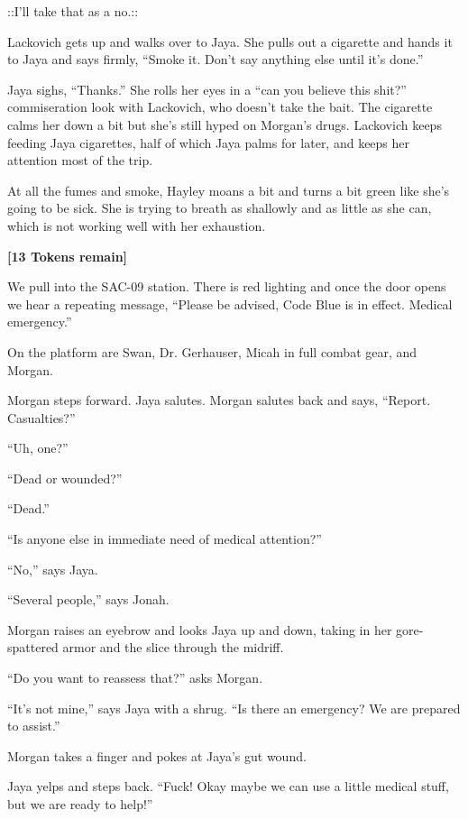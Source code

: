  {\color[RGB]{74,134,232}::I'll take that as a no.::} 



Lackovich gets up and walks over to Jaya.  She pulls out a cigarette and hands it to Jaya and says firmly, ``Smoke it.  Don't say anything else until it's done.''

Jaya sighs, ``Thanks.'' She rolls her eyes in a ``can you believe this shit?'' commiseration look with Lackovich, who doesn't take the bait.  The cigarette calms her down a bit but she's still hyped on Morgan's drugs.  Lackovich keeps feeding Jaya cigarettes, half of which Jaya palms for later, and keeps her attention most of the trip.

At all the fumes and smoke, Hayley moans a bit and turns a bit green like she's going to be sick. She is trying to breath as shallowly and as little as she can, which is not working well with her exhaustion.



\textbf{{[}13 Tokens remain{]}}





We pull into the SAC-09 station.  There is red lighting and once the door opens we hear a repeating message, ``Please be advised, Code Blue is in effect.  Medical emergency.''

On the platform are Swan, Dr. Gerhauser, Micah in full combat gear, and Morgan.



Morgan steps forward.  Jaya salutes.  Morgan salutes back and says, ``Report.  Casualties?''

``Uh, one?''

``Dead or wounded?''

``Dead.''

``Is anyone else in immediate need of medical attention?''

``No,'' says Jaya.

``Several people,'' says Jonah.

Morgan raises an eyebrow and looks Jaya up and down, taking in her gore-spattered armor and the slice through the midriff.

``Do you want to reassess that?'' asks Morgan.

``It's not mine,'' says Jaya with a shrug.  ``Is there an emergency?  We are prepared to assist.''

Morgan takes a finger and pokes at Jaya's gut wound.

Jaya yelps and steps back. ``Fuck!  Okay maybe we can use a little medical stuff, but we are ready to help!''

